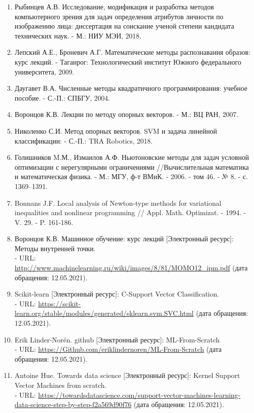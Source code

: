 \documentclass[12pt,a4paper]{article}
\begin{document}
\begin{enumerate}
    \item Рыбинцев А.В. Исследование, модификация и разработка методов компьютерного зрения для задач определения атрибутов личности по изображению лица: диссертация на соискание ученой степени кандидата технических наук. - М.: НИУ МЭИ, 2018.
    \item Лепский А.Е., Броневич А.Г. Математические методы распознавания образов: курс лекций. - Таганрог: Технологический институт Южного федерального университета, 2009.
    \item Даугавет В.А. Численные методы квадратичного программирования: учебное пособие. - С.-П.: СПБГУ, 2004.
    \item Воронцов К.В. Лекции по методу опорных векторов. - М.: ВЦ РАН, 2007.
    \item Николенко С.И. Метод опорных векторов. SVM и задача линейной классификации: - С.-П.: TRA Robotics, 2018.
    \item Голишников M.М., Измаилов А.Ф. Ньютоновские методы для задач условной оптимизации с нерегулярными ограничениями //Вычислительная математика и математическая физика. - М.: МГУ, ф-т ВМиК. - 2006. - том 46. - № 8. - с. 1369–1391.
    \item Bonnans J.F. Local analysis of Newton-type methods for variational inequalities and nonlinear programming // Appl. Math. Optimizat. - 1994. - V. 29. - P. 161-186.
    \item Воронцов К.В. Машинное обучение: курс лекций [Электронный ресурс]: Методы внутренней точки. \\ - URL: \url{http://www.machinelearning.ru/wiki/images/8/81/MOMO12_ipm.pdf} (дата обращения: 12.05.2021).
    \item Scikit-learn [Электронный ресурс]: C-Support Vector Classification. \\ - URL: \url{https://scikit-learn.org/stable/modules/generated/sklearn.svm.SVC.html} (дата обращения: 12.05.2021).
    \item Erik Linder-Norén. github [Электронный ресурс]: ML-From-Scratch \\ - URL: \url{https://Github.com/eriklindernoren/ML-From-Scratch} (дата обращения: 12.05.2021).
    \item Antoine Hue. Towards data science [Электронный ресурс]: Kernel Support Vector Machines from scratch. \\ - URL: \url{https://towardsdatascience.com/support-vector-machines-learning-data-science-step-by-step-f2a569d90f76} (дата обращения: 12.05.2021).

\end{enumerate}
\end{document}
